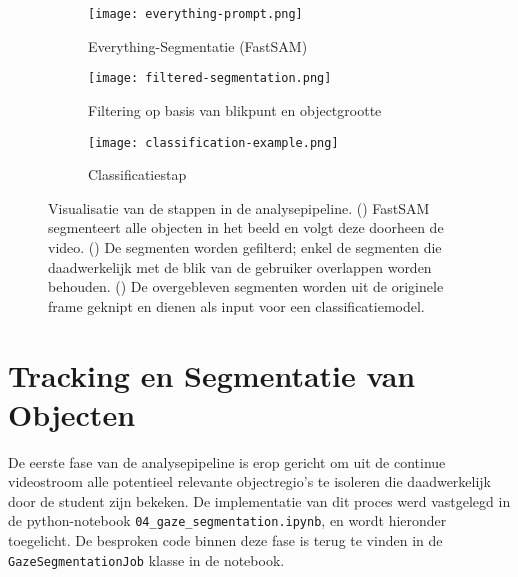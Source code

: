\begin{figure}[H]
    \centering
        \begin{subfigure}[b]{0.75\textwidth}
        \centering
        \texttt{[image: everything-prompt.png]}
        \caption{Everything-Segmentatie (FastSAM)}
        \label{fig:pipeline_stap_a}
    \end{subfigure}

    \vspace{0.5cm}

    \begin{subfigure}[b]{0.75\textwidth}
    \centering
    \texttt{[image: filtered-segmentation.png]}
    \caption{Filtering op basis van blikpunt en objectgrootte}
    \label{fig:pipeline_stap_b}
    \end{subfigure}

    \vspace{0.5cm}

    \begin{subfigure}[b]{0.75\textwidth}
        \centering
        \texttt{[image: classification-example.png]}
        \caption{Classificatiestap}
        \label{fig:pipeline_stap_c}
    \end{subfigure}
    \caption[Visualisatie van de Analysepipeline]{
        \label{fig:analyse-pipeline-visualisatie}
        Visualisatie van de stappen in de analysepipeline.
        () FastSAM segmenteert alle objecten in het beeld en volgt deze doorheen de video.
        () De segmenten worden gefilterd; enkel de segmenten die daadwerkelijk met de blik van de gebruiker overlappen worden behouden.
        () De overgebleven segmenten worden uit de originele frame geknipt en dienen als input voor een classificatiemodel.
    }
\end{figure}

\section{Tracking en Segmentatie van Objecten}
\label{sec:tracking-segmentatie}

De eerste fase van de analysepipeline is erop gericht om uit de continue videostroom alle potentieel relevante objectregio's 
te isoleren die daadwerkelijk door de student zijn bekeken. 
De implementatie van dit proces werd vastgelegd in de python-notebook \texttt{04\_gaze\_segmentation.ipynb},
en wordt hieronder toegelicht.
De besproken code binnen deze fase is terug te vinden in de \texttt{GazeSegmentationJob} klasse in de notebook.

